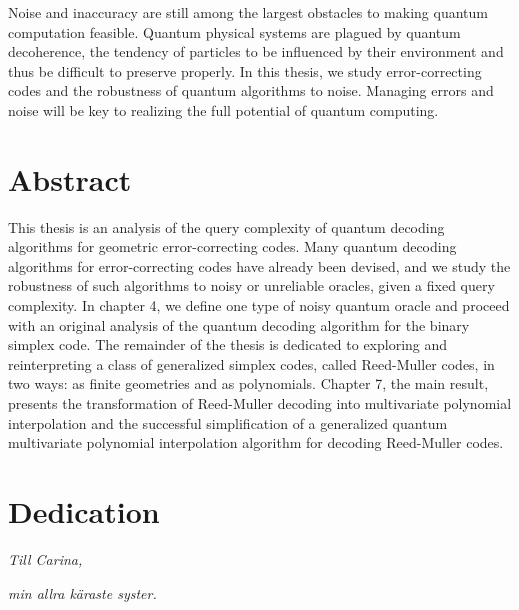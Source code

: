 \documentclass[12pt,twoside]{reedthesis}
\theoremstyle{definition}
\begin{document}
Noise and inaccuracy are still among the largest obstacles to making quantum computation feasible. Quantum physical systems are plagued by quantum decoherence, the tendency of particles to be influenced by their environment and thus be difficult to preserve properly. In this thesis, we study error-correcting codes and the robustness of quantum algorithms to noise. Managing errors and noise will be key to realizing the full potential of quantum computing.
 
 

    \tableofcontents

  \chapter*{Abstract}
This thesis is an analysis of the query complexity of quantum decoding algorithms for geometric error-correcting codes. Many quantum decoding algorithms for error-correcting codes have already been devised, and we study the robustness of such algorithms to noisy or unreliable oracles, given a fixed query complexity. In chapter 4, we define one type of noisy quantum oracle and proceed with an original analysis of the quantum decoding algorithm for the binary simplex code. The remainder of the thesis is dedicated to exploring and reinterpreting a class of generalized simplex codes, called Reed-Muller codes, in two ways: as finite geometries and as polynomials. Chapter 7, the main result, presents the transformation of Reed-Muller decoding into multivariate polynomial interpolation and the  successful simplification of a generalized quantum multivariate polynomial interpolation algorithm for decoding Reed-Muller codes. 


\chapter*{Dedication}
\textit{Till Carina,} 

\textit{min allra k\"{a}raste syster.}


  \mainmatter %
  \pagestyle{fancyplain} %

\end{document}
